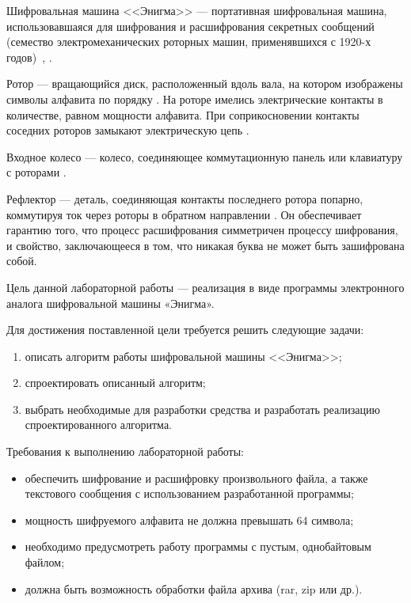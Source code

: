 
Шифровальная машина <<Энигма>> --- портативная шифровальная машина, использовавшаяся для шифрования и расшифрования секретных сообщений (семество электромеханических роторных машин, применявшихся с 1920-х годов)~\cite{попов1история}, \cite{шолин2018алгоритм}.

Ротор --- вращающийся диск, расположенный вдоль вала, на котором изображены символы алфавита по порядку \cite{бабаш2015информационная}.
На роторе имелись электрические контакты в количестве, равном мощности алфавита.
При соприкосновении контакты соседних роторов замыкают электрическую цепь \cite{шолин2018алгоритм}.

Входное колесо --- колесо, соединяющее коммутационную панель или клавиатуру с роторами \cite{шолин2018алгоритм}.

Рефлектор --- деталь, соединяющая контакты последнего ротора попарно, коммутируя ток через роторы в обратном направлении \cite{шолин2018алгоритм}.
Он обеспечивает гарантию того, что процесс расшифрования симметричен процессу шифрования, и свойство, заключающееся в том, что никакая буква не может быть зашифрована собой.

Цель данной лабораторной работы --- реализация в виде программы электронного аналога шифровальной машины «Энигма».

Для достижения поставленной цели требуется решить следующие задачи:
\begin{enumerate}
	\item описать алгоритм работы шифровальной машины <<Энигма>>;
	\item спроектировать описанный алгоритм;
	\item выбрать необходимые для разработки средства и разработать реализацию спроектированного алгоритма.
\end{enumerate}

Требования к выполнению лабораторной работы:
\begin{itemize}
	\item обеспечить шифрование и расшифровку произвольного файла, а также текстового сообщения с использованием разработанной программы;
	\item мощность шифруемого алфавита не должна превышать 64 символа;
	\item необходимо предусмотреть работу программы с пустым, однобайтовым файлом;
	\item должна быть возможность обработки файла архива (rar, zip или др.).
\end{itemize}
